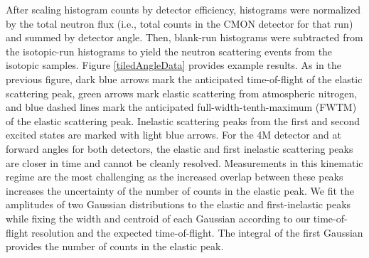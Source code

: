After scaling histogram counts by detector efficiency, histograms were
normalized by the total neutron flux
(i.e., total counts in the CMON detector for that run) and summed by detector
angle. Then, blank-run histograms
were subtracted from the isotopic-run histograms to yield the neutron scattering
events from the isotopic samples. Figure \ref{tiledAngleData} provides example 
results. As in the previous figure, dark blue arrows mark the anticipated
time-of-flight of the elastic scattering peak, green arrows mark elastic
scattering from atmospheric nitrogen, and blue dashed lines mark the anticipated
full-width-tenth-maximum (FWTM) of the elastic scattering peak.
Inelastic scattering peaks from the first and
second excited states are marked with light blue
arrows. For the 4M detector and at forward angles for both detectors, the elastic and first 
inelastic scattering peaks are closer in time and cannot be cleanly resolved. Measurements in this
kinematic regime are the most challenging as the increased overlap between
these peaks increases the uncertainty of the number of counts in the elastic
peak. We fit the amplitudes of two Gaussian distributions to the elastic and
first-inelastic peaks while fixing
the width and centroid of each Gaussian according to our time-of-flight resolution and
the expected time-of-flight. The integral of the first Gaussian provides the
number of counts in the elastic peak.

